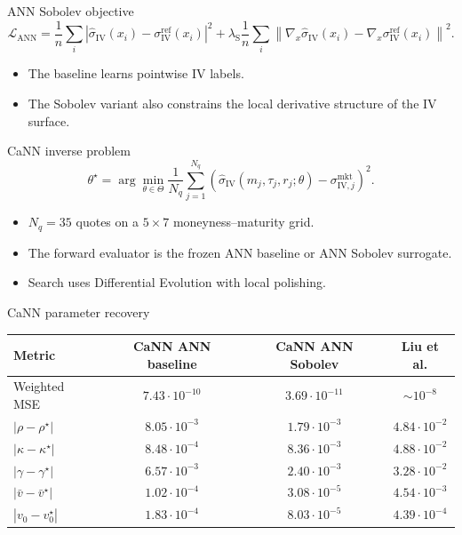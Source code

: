 \begin{frame}{ANN Sobolev objective}
  \[
    \mathcal{L}_{\mathrm{ANN}}
      =
      \frac{1}{n}\sum_i
      \left|\hat\sigma_{\mathrm{IV}}(x_i)-\sigma_{\mathrm{IV}}^{\mathrm{ref}}(x_i)\right|^2
      +
      \lambda_{\mathrm{S}}
      \frac{1}{n}\sum_i
      \left\|\nabla_x\hat\sigma_{\mathrm{IV}}(x_i)
      - \nabla_x\sigma_{\mathrm{IV}}^{\mathrm{ref}}(x_i)\right\|^2.
  \]

  \begin{itemize}
    \item The baseline learns pointwise IV labels.
    \item The Sobolev variant also constrains the local derivative structure of the IV surface.
  \end{itemize}
\end{frame}

\begin{frame}{CaNN inverse problem}
  \[
    \theta^\star
    =
    \arg\min_{\theta\in\Theta}
    \frac{1}{N_q}\sum_{j=1}^{N_q}
    \left(
      \hat\sigma_{\mathrm{IV}}(m_j,\tau_j,r_j;\theta)
      -
      \sigma^{\mathrm{mkt}}_{\mathrm{IV},j}
    \right)^2.
  \]

  \begin{itemize}
    \item \(N_q=35\) quotes on a \(5\times7\) moneyness--maturity grid.
    \item The forward evaluator is the frozen ANN baseline or ANN Sobolev surrogate.
    \item Search uses Differential Evolution with local polishing.
  \end{itemize}
\end{frame}

\begin{frame}{CaNN parameter recovery}
  \centering
  \scriptsize
  \begin{tabular}{lccc}
    \toprule
    Metric & CaNN ANN baseline & CaNN ANN Sobolev & Liu et al. \\
    \midrule
    Weighted MSE & \(7.43\cdot10^{-10}\) & \(3.69\cdot10^{-11}\) & \(\sim10^{-8}\) \\
    \(|\rho-\rho^\star|\) & \(8.05\cdot10^{-3}\) & \(1.79\cdot10^{-3}\) & \(4.84\cdot10^{-2}\) \\
    \(|\kappa-\kappa^\star|\) & \(8.48\cdot10^{-4}\) & \(8.36\cdot10^{-3}\) & \(4.88\cdot10^{-2}\) \\
    \(|\gamma-\gamma^\star|\) & \(6.57\cdot10^{-3}\) & \(2.40\cdot10^{-3}\) & \(3.28\cdot10^{-2}\) \\
    \(|\bar v-\bar v^\star|\) & \(1.02\cdot10^{-4}\) & \(3.08\cdot10^{-5}\) & \(4.54\cdot10^{-3}\) \\
    \(|v_0-v_0^\star|\) & \(1.83\cdot10^{-4}\) & \(8.03\cdot10^{-5}\) & \(4.39\cdot10^{-4}\) \\
    \bottomrule
  \end{tabular}
\end{frame}

